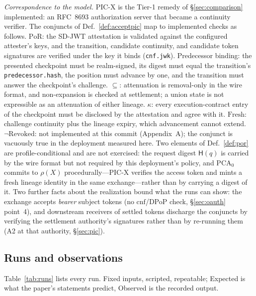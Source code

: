 \documentclass[conference]{IEEEtran}
\newcommand{\PoR}{\mathrm{PoR}}
\newcommand{\Hsh}{\mathsf{H}}
\begin{document}
\emph{Correspondence to the model.} PIC-X is the Tier-1 remedy of \S\ref{sec:comparison} implemented: an RFC~8693 authorization server that became a continuity verifier. The conjuncts of Def.~\ref{def:acceptpic} map to implemented checks as follows. $\PoR$: the SD-JWT attestation is validated against the configured attester's keys, and the transition, candidate continuity, and candidate token signatures are verified under the key it binds (\texttt{cnf.jwk}). Predecessor binding: the presented checkpoint must be realm-signed, its digest must equal the transition's \texttt{predecessor.hash}, the position must advance by one, and the transition must answer the checkpoint's challenge. $\subseteq$: attenuation is removal-only in the wire format, and non-expansion is checked at settlement; a union state is not expressible as an attenuation of either lineage. $\kappa$: every execution-contract entry of the checkpoint must be disclosed by the attestation and agree with it. $\mathrm{Fresh}$: challenge continuity plus the lineage expiry, which advancement cannot extend. $\neg\mathrm{Revoked}$: not implemented at this commit (Appendix~A); the conjunct is vacuously true in the deployment measured here. Two elements of Def.~\ref{def:por} are profile-conditional and are not exercised: the request digest $\Hsh(q)$ is carried by the wire format but not required by this deployment's policy, and $\mathrm{PCA}_0$ commits to $\rho(X)$ procedurally---PIC-X verifies the access token and mints a fresh lineage identity in the same exchange---rather than by carrying a digest of it. Two further facts about the realization bound what the runs can show: the exchange accepts \emph{bearer} subject tokens (no $\mathrm{cnf}$/DPoP check, \S\ref{sec:oauth} point~4), and downstream receivers of settled tokens discharge the conjuncts by verifying the settlement authority's signatures rather than by re-running them (A2 at that authority, \S\ref{sec:pic}).

\subsection{Runs and observations}

Table~\ref{tab:runs} lists every run. Fixed inputs, scripted, repeatable; Expected is what the paper's statements predict, Observed is the recorded output.
\end{document}
